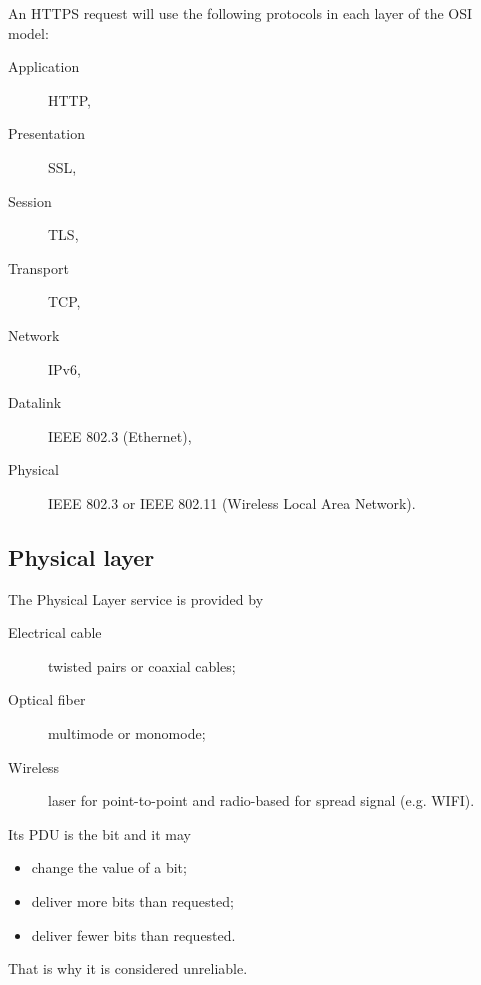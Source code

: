 \begin{myexem}
  An HTTPS request will use the following protocols in each layer of the OSI model:
  \begin{description}
    \item[Application] HTTP,
    \item[Presentation] SSL,
    \item[Session] TLS,
    \item[Transport] TCP,
    \item[Network] IPv6,
    \item[Datalink] IEEE 802.3 (Ethernet),
    \item[Physical] IEEE 802.3 or IEEE 802.11 (Wireless Local Area Network).
  \end{description}
\end{myexem}

\subsection{Physical layer}
The Physical Layer service is provided by
\begin{description}
  \item[Electrical cable] twisted pairs or coaxial cables;
  \item[Optical fiber] multimode or monomode;
  \item[Wireless] laser for point-to-point and radio-based for spread signal (e.g. WIFI).
\end{description}
Its PDU is the bit and it may
\begin{itemize}
  \item change the value of a bit;
  \item deliver more bits than requested;
  \item deliver fewer bits than requested.
\end{itemize}
That is why it is considered unreliable.

\biblio


